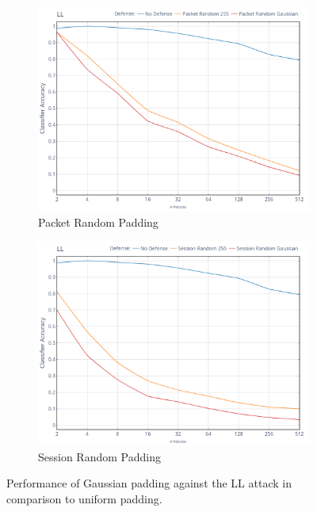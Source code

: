 \documentclass[
	ruledheaders=chapter,
	class=report,
	thesis={type=master, department=inf},
	accentcolor=1c,
	custommargins=true,
	marginpar=false,
	parskip=half-,
	fontsize=11pt,
]{tudapub}
\begin{document}
	\begin{figure}
		\begin{subfigure}{0.495\textwidth}
			\centering
			\includegraphics[width=\textwidth]{plots/performance_ll_pkt.png}
			\caption{Packet Random Padding}
		\end{subfigure}
		\hfill
		\begin{subfigure}{0.495\textwidth}
			\centering
			\includegraphics[width=\textwidth]{plots/performance_ll_ses.png}
			\caption{Session Random Padding}
		\end{subfigure}
		\caption[Performance of Gaussian padding against the LL attack]{Performance of Gaussian padding against the LL attack \cite{Liberatore2006} in comparison to uniform padding.}
		\label{fig:ll}
	\end{figure}
\end{document}
